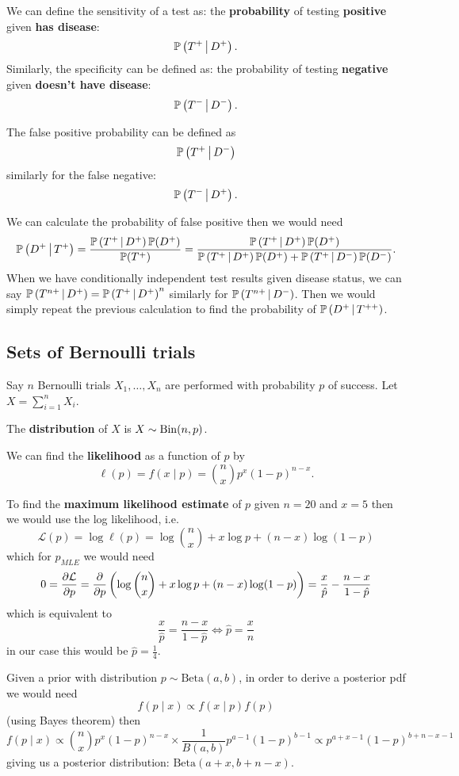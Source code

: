 \documentclass[10pt, a4paper]{article}
\begin{document}
We can define the sensitivity of a test as:
the \textbf{probability} of testing \textbf{positive} given \textbf{has disease}:
\[
\cP{T ^ {+}}{D ^ {+}}.
\]
Similarly,
the specificity can be defined as:
the probability of testing \textbf{negative} given \textbf{doesn't have disease}:
\[
\cP{T ^ {-}}{D ^ {-}}.
\]

The false positive probability can be defined as
\[
\cP{T ^ {+}}{D ^ {-}}
\]
similarly for the false negative:
\[
\cP{T ^ {-}}{D ^ {+}}.
\]

We can calculate the probability of false positive then we would need
\[
\cP{D ^ {+}}{T ^ {+}} = \frac{\cP{T ^ {+}}{D ^ {+}}\P(D ^ {+})}{\P(T ^ {+})} = \frac{\cP{T ^ {+}}{D ^ {+}}\P(D ^ {+})}{\cP{T ^ {+}}{D ^ {+}}\P(D ^ {+}) + \cP{T ^ {+}}{D ^ {-}}\P(D ^ {-})}.
\]
When we have conditionally independent test results given disease status,
we can say $\cP{T ^ {n+}}{D ^ {+}} = \cP{T ^ {+}}{D ^ {+}} ^ n$ similarly for $\cP{T ^ {n+}}{D ^ {-}}$.
Then we would simply repeat the previous calculation to find the probability of $\cP{D ^ {+}}{T ^ {++}}$.

\subsection{Sets of Bernoulli trials}
Say $n$ Bernoulli trials $X_1, \dotsc, X_n$ are performed with probability $p$ of success.
Let $X = \sum_{i = 1}^{n}X_i$.

The \textbf{distribution} of $X$ is $X \sim \Bin(n, p)$.

We can find the \textbf{likelihood} as a function of $p$ by
\[
\ell(p) = f(x\mid p) = \binom{n}{x}p ^ x(1 - p) ^ {n - x}.
\]

To find the \textbf{maximum likelihood estimate} of $p$ given $n = 20$ and $x = 5$ then we would use the log likelihood,
i.e.
\[
\mathcal{L}(p) = \log{\ell(p)} = \log{\binom{n}{x}} + x\log{p} + (n - x)\log(1 - p)
\]
which for $p_{MLE}$ we would need
\[
0 = \pd[\mathcal{L}]{p} = \pd{p}\left(\log{\binom{n}{x}} + x\log{p} + (n - x)\log(1 - p)\right) = \frac{x}{\hat{p}} - \frac{n - x}{1 - \hat{p}}
\]
which is equivalent to
\[
\frac{x}{\hat{p}} = \frac{n - x}{1 - \hat{p}} \iff \hat{p} = \frac{x}{n}
\]
in our case this would be $\hat{p} = \frac{1}{4}$.


Given a prior with distribution $p \sim \mathrm{Beta}(a, b)$,
in order to derive a posterior pdf we would need
\[
f(p\mid x) \propto f(x\mid p)f(p)
\]
(using Bayes theorem)
then
\[
f(p \mid x) \propto \binom{n}{x}p ^ x(1 - p) ^ {n - x}\times\frac{1}{B(a, b)}p ^ {a - 1}(1 - p) ^ {b - 1}\propto p ^ {a + x - 1}(1 - p) ^ {b + n - x - 1}
\]
giving us a posterior distribution:
$\mathrm{Beta}(a + x, b + n - x)$.
\end{document}
